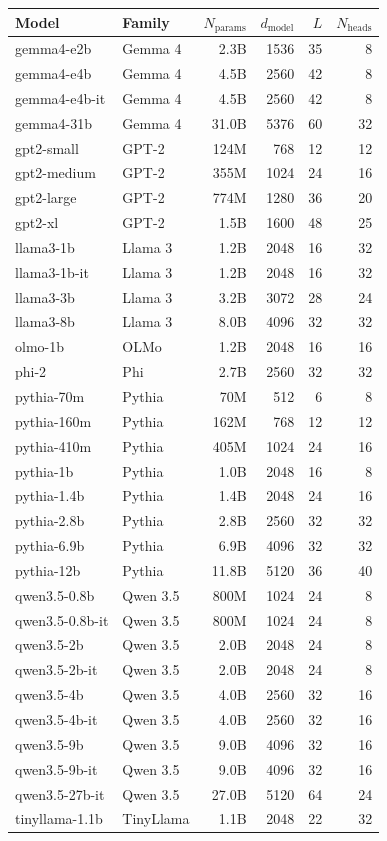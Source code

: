 \begin{tabular}{@{}llrrrr@{}}
\toprule
\textbf{Model} & \textbf{Family} & $N_{\text{params}}$ & $d_{\text{model}}$ & $L$ & $N_{\text{heads}}$ \\
\midrule
gemma4-e2b & Gemma 4 & 2.3B & 1536 & 35 & 8 \\
gemma4-e4b & Gemma 4 & 4.5B & 2560 & 42 & 8 \\
gemma4-e4b-it & Gemma 4 & 4.5B & 2560 & 42 & 8 \\
gemma4-31b & Gemma 4 & 31.0B & 5376 & 60 & 32 \\
\midrule
gpt2-small & GPT-2 & 124M & 768 & 12 & 12 \\
gpt2-medium & GPT-2 & 355M & 1024 & 24 & 16 \\
gpt2-large & GPT-2 & 774M & 1280 & 36 & 20 \\
gpt2-xl & GPT-2 & 1.5B & 1600 & 48 & 25 \\
\midrule
llama3-1b & Llama 3 & 1.2B & 2048 & 16 & 32 \\
llama3-1b-it & Llama 3 & 1.2B & 2048 & 16 & 32 \\
llama3-3b & Llama 3 & 3.2B & 3072 & 28 & 24 \\
llama3-8b & Llama 3 & 8.0B & 4096 & 32 & 32 \\
\midrule
olmo-1b & OLMo & 1.2B & 2048 & 16 & 16 \\
\midrule
phi-2 & Phi & 2.7B & 2560 & 32 & 32 \\
\midrule
pythia-70m & Pythia & 70M & 512 & 6 & 8 \\
pythia-160m & Pythia & 162M & 768 & 12 & 12 \\
pythia-410m & Pythia & 405M & 1024 & 24 & 16 \\
pythia-1b & Pythia & 1.0B & 2048 & 16 & 8 \\
pythia-1.4b & Pythia & 1.4B & 2048 & 24 & 16 \\
pythia-2.8b & Pythia & 2.8B & 2560 & 32 & 32 \\
pythia-6.9b & Pythia & 6.9B & 4096 & 32 & 32 \\
pythia-12b & Pythia & 11.8B & 5120 & 36 & 40 \\
\midrule
qwen3.5-0.8b & Qwen 3.5 & 800M & 1024 & 24 & 8 \\
qwen3.5-0.8b-it & Qwen 3.5 & 800M & 1024 & 24 & 8 \\
qwen3.5-2b & Qwen 3.5 & 2.0B & 2048 & 24 & 8 \\
qwen3.5-2b-it & Qwen 3.5 & 2.0B & 2048 & 24 & 8 \\
qwen3.5-4b & Qwen 3.5 & 4.0B & 2560 & 32 & 16 \\
qwen3.5-4b-it & Qwen 3.5 & 4.0B & 2560 & 32 & 16 \\
qwen3.5-9b & Qwen 3.5 & 9.0B & 4096 & 32 & 16 \\
qwen3.5-9b-it & Qwen 3.5 & 9.0B & 4096 & 32 & 16 \\
qwen3.5-27b-it & Qwen 3.5 & 27.0B & 5120 & 64 & 24 \\
\midrule
tinyllama-1.1b & TinyLlama & 1.1B & 2048 & 22 & 32 \\
\bottomrule
\end{tabular}